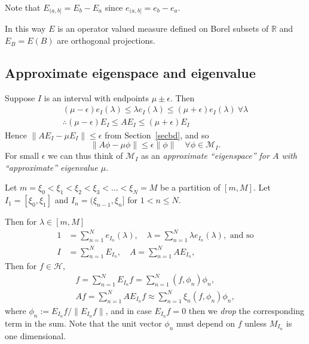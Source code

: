 \documentclass[a4paper]{amsart}
\theoremstyle{plain}
\theoremstyle{definition}
\theoremstyle{remark}
\begin{document}
Note that $ E_{(a,b]} = E_b - E_a $ since $ e_{(a,b]} = e_b - e_a $.   

In this way $ E $ is an operator valued measure defined on Borel subsets of $ \mathbb{R} $ and    $ E_B =E(B)$ are orthogonal projections.

\subsection{Approximate eigenspace and eigenvalue}  \label{secaee} Suppose $ I $ is an interval with endpoints $ \mu \pm\epsilon $.  Then
\begin{gather*}
( \mu - \epsilon )e_I( \lambda ) \leq \lambda e_I(\lambda) 
                                          \leq (\mu + \epsilon ) e_I ( \lambda ) \ \forall \lambda  \\
\therefore ( \mu - \epsilon )E_I  \leq A E_I 
                                          \leq (\mu + \epsilon ) E_I 
 \end{gather*}
Hence $ \|AE_I - \mu E_I \| \leq \epsilon $ from Section~\ref{secbd}, and so 
\begin{equation} \label{sest}
\| A \phi - \mu \phi \| \leq \epsilon \|\phi\| \quad  \forall \phi \in \mathcal{M}_I.
\end{equation}                                     
For small $ \epsilon $ we can thus think of $ \mathcal{M}_I $ as an \emph{approximate ``eigenspace'' for $ A $ with ``approximate'' eigenvalue $\mu$}.

\medskip
Let $ m=\xi_0  < \xi_1  <  \xi_2 < \xi_3 < \dots < \xi_N =M $  be a partition of $ [m,M] $. Let $ I_1= [\xi_0, \xi_1 ] $ and $  I_n = (\xi_{n-1}, \xi_n ] $ for $ 1< n \leq N$.

Then for $ \lambda \in [m,M] $ 
\begin{align}
1&= \sum_{n=1}^N e_{I_n} ( \lambda ) , \quad \lambda 
        = \sum_{n=1}^N \lambda e_{I_n} ( \lambda ), \text{ and so}\\
 I&= \sum_{n=1}^N E_{I_n}  , \quad A
        = \sum_{n=1}^N A E_{I_n}  , \label{defI}
        \end{align} 
Then for $ f \in \mathcal{H} $, 
\begin{align} 
 f= \sum_{n=1}^N E_{I_n} f  = \sum_{n=1}^N (f,\phi_n) \phi_n, \label{idest}\\
 Af =  \sum_{n=1}^N A E_{I_n}f \approx  \sum_{n=1}^N \xi_n  (f,\phi_n) \phi_n \label{frs} ,
\end{align} 
where $ \phi_n := E_{I_n}f / \|E_{I_n}f  \| $, and  in case $  E_{I_n}f = 0 $ then we \emph{drop} the corresponding term in the sum.  Note that the unit vector $ \phi_n $ must depend  on $ f $ unless   $ M_{I_n} $ is one dimensional.
 
\end{document}
